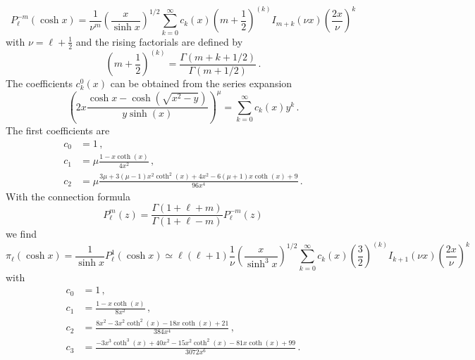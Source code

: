 \documentclass[onecolumn%
              ,superscriptaddress%
              ,aps%
              ,pra]{revtex4}
\begin{document}
\begin{equation}
P^{-m}_\ell (\cosh x) = \frac{1}{\nu^m} \left(\frac{x}{\sinh x}\right)^{1/2} \sum_{k=0}^\infty c_k(x) \left(m+\frac{1}{2}\right)^{(k)} I_{m+k}(\nu x) \left(\frac{2x}{\nu}\right)^k
\end{equation}
with $\nu = \ell + \frac{1}{2}$ and the rising factorials are defined by
\begin{equation}
\left(m+\frac{1}{2}\right)^{(k)} = \frac{\Gamma(m+k+1/2)}{\Gamma(m+1/2)}\,.
\end{equation}
The coefficients $c_k^0(x)$ can be obtained from the series expansion
\begin{equation}
\left(2x\frac{\cosh x - \cosh\left(\sqrt{x^2-y}\right)}{y \sinh(x)}\right)^{\mu} = \sum_{k=0}^\infty c_k(x) y^k\,.
\end{equation}
The first coefficients are
\begin{equation}
\begin{aligned}
c_0 &= 1\,, \\
c_1 &= \mu\frac{1-  x \coth (x)}{4 x^2}\,, \\
c_2 &= \mu\frac{3 \mu +3 (\mu -1) x^2 \coth ^2(x)+4 x^2-6 (\mu +1) x \coth (x)+9}{96 x^4}\,.
\end{aligned}
\end{equation}
With the connection formula
\begin{equation}
P^m_\ell (z) = \frac{\Gamma(1+\ell+m)}{\Gamma(1+\ell-m)}P_\ell^{-m}(z)
\end{equation}
we find
\begin{equation}
\pi_\ell(\cosh x) = \frac{1}{\sinh x}P^1_\ell(\cosh x) \simeq \ell(\ell+1) \frac{1}{\nu} \left(\frac{x}{\sinh^3 x}\right)^{1/2} \sum_{k=0}^\infty c_k(x) \left(\frac{3}{2}\right)^{(k)} I_{k+1}(\nu x) \left(\frac{2x}{\nu}\right)^k
\end{equation}
with
\begin{equation}
\begin{aligned}
c_0 &= 1\,, \\
c_1 &= \frac{1-x \coth (x)}{8 x^2}\,, \\
c_2 &= \frac{8 x^2-3 x^2 \coth ^2(x)-18 x \coth (x)+21}{384 x^4}\,, \\
c_3 &= \frac{-3 x^3 \coth ^3(x)+40 x^2-15 x^2 \coth ^2(x)-81 x \coth (x)+99}{3072 x^6}\,.
\end{aligned}
\end{equation}
\end{document}

